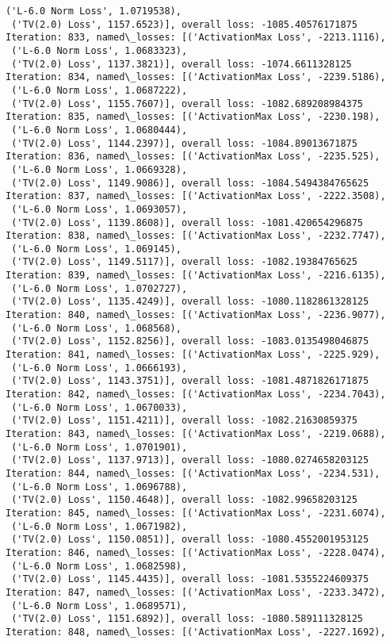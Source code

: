 \documentclass[10pt]{article}
\begin{document}
\begin{Verbatim}[commandchars=\\\{\}]
 ('L-6.0 Norm Loss', 1.0719538),
 ('TV(2.0) Loss', 1157.6523)], overall loss: -1085.40576171875
Iteration: 833, named\_losses: [('ActivationMax Loss', -2213.1116),
 ('L-6.0 Norm Loss', 1.0683323),
 ('TV(2.0) Loss', 1137.3821)], overall loss: -1074.6611328125
Iteration: 834, named\_losses: [('ActivationMax Loss', -2239.5186),
 ('L-6.0 Norm Loss', 1.0687222),
 ('TV(2.0) Loss', 1155.7607)], overall loss: -1082.689208984375
Iteration: 835, named\_losses: [('ActivationMax Loss', -2230.198),
 ('L-6.0 Norm Loss', 1.0680444),
 ('TV(2.0) Loss', 1144.2397)], overall loss: -1084.89013671875
Iteration: 836, named\_losses: [('ActivationMax Loss', -2235.525),
 ('L-6.0 Norm Loss', 1.0669328),
 ('TV(2.0) Loss', 1149.9086)], overall loss: -1084.5494384765625
Iteration: 837, named\_losses: [('ActivationMax Loss', -2222.3508),
 ('L-6.0 Norm Loss', 1.0693057),
 ('TV(2.0) Loss', 1139.8608)], overall loss: -1081.420654296875
Iteration: 838, named\_losses: [('ActivationMax Loss', -2232.7747),
 ('L-6.0 Norm Loss', 1.069145),
 ('TV(2.0) Loss', 1149.5117)], overall loss: -1082.19384765625
Iteration: 839, named\_losses: [('ActivationMax Loss', -2216.6135),
 ('L-6.0 Norm Loss', 1.0702727),
 ('TV(2.0) Loss', 1135.4249)], overall loss: -1080.1182861328125
Iteration: 840, named\_losses: [('ActivationMax Loss', -2236.9077),
 ('L-6.0 Norm Loss', 1.068568),
 ('TV(2.0) Loss', 1152.8256)], overall loss: -1083.0135498046875
Iteration: 841, named\_losses: [('ActivationMax Loss', -2225.929),
 ('L-6.0 Norm Loss', 1.0666193),
 ('TV(2.0) Loss', 1143.3751)], overall loss: -1081.4871826171875
Iteration: 842, named\_losses: [('ActivationMax Loss', -2234.7043),
 ('L-6.0 Norm Loss', 1.0670033),
 ('TV(2.0) Loss', 1151.4211)], overall loss: -1082.21630859375
Iteration: 843, named\_losses: [('ActivationMax Loss', -2219.0688),
 ('L-6.0 Norm Loss', 1.0701901),
 ('TV(2.0) Loss', 1137.9713)], overall loss: -1080.0274658203125
Iteration: 844, named\_losses: [('ActivationMax Loss', -2234.531),
 ('L-6.0 Norm Loss', 1.0696788),
 ('TV(2.0) Loss', 1150.4648)], overall loss: -1082.99658203125
Iteration: 845, named\_losses: [('ActivationMax Loss', -2231.6074),
 ('L-6.0 Norm Loss', 1.0671982),
 ('TV(2.0) Loss', 1150.0851)], overall loss: -1080.4552001953125
Iteration: 846, named\_losses: [('ActivationMax Loss', -2228.0474),
 ('L-6.0 Norm Loss', 1.0682598),
 ('TV(2.0) Loss', 1145.4435)], overall loss: -1081.5355224609375
Iteration: 847, named\_losses: [('ActivationMax Loss', -2233.3472),
 ('L-6.0 Norm Loss', 1.0689571),
 ('TV(2.0) Loss', 1151.6892)], overall loss: -1080.589111328125
Iteration: 848, named\_losses: [('ActivationMax Loss', -2227.1692),

\end{Verbatim}
\end{document}
